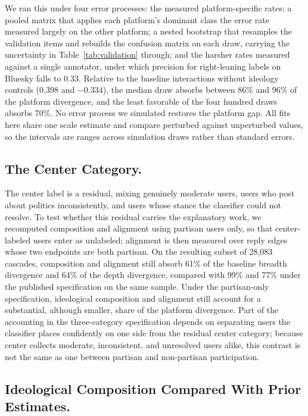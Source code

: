 \documentclass[letterpaper]{article} %
\newcommand{\rev}[1]{{\color{blue}#1}}
\begin{document}
\rev{We ran this under four error processes: the measured platform-specific rates; a pooled matrix that applies each platform's dominant class the error rate measured largely on the other platform; a nested bootstrap that resamples the validation items and rebuilds the confusion matrix on each draw, carrying the uncertainty in Table~\ref{tab:validation} through; and the harsher rates measured against a single annotator, under which precision for right-leaning labels on Bluesky falls to 0.33. Relative to the baseline interactions without ideology controls ($0.398$ and $-0.334$), the median draw absorbs between 86\% and 96\% of the platform divergence, and the least favorable of the four hundred draws absorbs 70\%. No error process we simulated restores the platform gap. All fits here share one scale estimate and compare perturbed against unperturbed values, so the intervals are ranges across simulation draws rather than standard errors.}

\subsection*{\rev{The Center Category.}}

\rev{The center label is a residual, mixing genuinely moderate users, users who post about politics inconsistently, and users whose stance the classifier could not resolve. To test whether this residual carries the explanatory work, we recomputed composition and alignment using partisan users only, so that center-labeled users enter as unlabeled; alignment is then measured over reply edges whose two endpoints are both partisan. On the resulting subset of 28,083 cascades, composition and alignment still absorb 61\% of the baseline breadth divergence and 64\% of the depth divergence, compared with 99\% and 77\% under the published specification on the same sample. Under the partisan-only specification, ideological composition and alignment still account for a substantial, although smaller, share of the platform divergence. Part of the accounting in the three-category specification depends on separating users the classifier places confidently on one side from the residual center category; because center collects moderate, inconsistent, and unresolved users alike, this contrast is not the same as one between partisan and non-partisan participation.}

\subsection*{\rev{Ideological Composition Compared With Prior Estimates.}}
\end{document}
